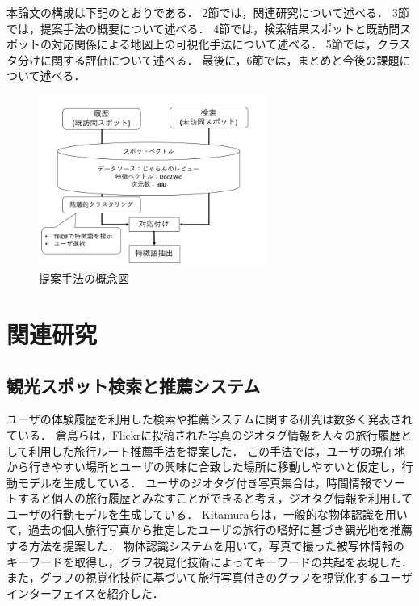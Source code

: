 \documentclass{deimj}
\begin{document}
本論文の構成は下記のとおりである．
2節では，関連研究について述べる．
3節では，提案手法の概要について述べる．
4節では，検索結果スポットと既訪問スポットの対応関係による地図上の可視化手法について述べる．
5節では，クラスタ分けに関する評価について述べる．
最後に，6節では，まとめと今後の課題について述べる．

\begin{figure}[t]
  \begin{center}
    \includegraphics[clip,width=7.5cm]{picture/system_image.png}
    \caption{提案手法の概念図}
    \label{fig:image}
   \end{center}
\end{figure}


\section{関連研究}
\label{sec:関連研究}
\subsection{観光スポット検索と推薦システム}
ユーザの体験履歴を利用した検索や推薦システムに関する研究は数多く発表されている．
倉島ら\cite{Kurashima}は，Flickrに投稿された写真のジオタグ情報を人々の旅行履歴として利用した旅行ルート推薦手法を提案した．
この手法では，ユーザの現在地から行きやすい場所とユーザの興味に合致した場所に移動しやすいと仮定し，行動モデルを生成している．
ユーザのジオタグ付き写真集合は，時間情報でソートすると個人の旅行履歴とみなすことができると考え，ジオタグ情報を利用してユーザの行動モデルを生成している．
Kitamuraら\cite{Kitamura}は，一般的な物体認識を用いて，過去の個人旅行写真から推定したユーザの旅行の嗜好に基づき観光地を推薦する方法を提案した．
物体認識システムを用いて，写真で撮った被写体情報のキーワードを取得し，グラフ視覚化技術によってキーワードの共起を表現した．
また，グラフの視覚化技術に基づいて旅行写真付きのグラフを視覚化するユーザインターフェイスを紹介した．
\end{document}
